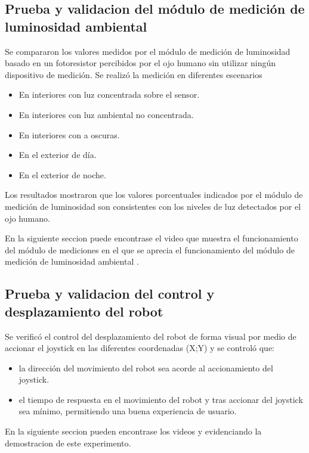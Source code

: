 \subsection{Prueba y validacion del módulo de medición de luminosidad ambiental}

Se compararon los valores medidos por el módulo de medición de luminosidad basado en un fotoresistor percibidos por el ojo humano sin utilizar ningún dispositivo de medición. Se realizó la medición en diferentes escenarios

\begin{itemize}
	\item En interiores con luz concentrada sobre el sensor.
	\item En interiores con luz ambiental no concentrada.
	\item En interiores con a oscuras.
	\item En el exterior de día.
	\item En el exterior de noche.
\end{itemize}

Los resultados mostraron que los valores porcentuales indicados por el módulo de medición de luminosidad son consistentes con los niveles de luz detectados por el ojo humano. 

En la siguiente seccion puede encontrase el video que muestra el funcionamiento del módulo de mediciones en el que se aprecia el funcionamiento del módulo de medición de luminosidad ambiental \cite{Demo_Mediciones}.

\subsection{Prueba y validacion del control y desplazamiento del robot}

Se verificó el control del desplazamiento del robot de forma visual por medio de accionar el joystick en las diferentes coordenadas (X;Y) y se controló que:

\begin{itemize}
	\item la dirección del movimiento del robot sea acorde al accionamiento del joystick.
	\item el tiempo de respuesta en el movimiento del robot y tras accionar del joystick sea mínimo, permitiendo una buena experiencia de usuario.
\end{itemize}

En la siguiente seccion pueden encontrase los videos \cite{Demo_Control_Movimiento_1} y \cite{Demo_Control_Movimiento_2} evidenciando la demostracion de este experimento.



